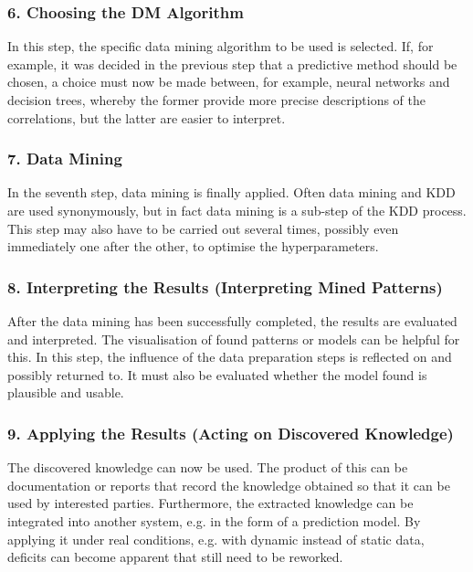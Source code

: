 \subsubsection{6. Choosing the DM Algorithm}

In this step, the specific data mining algorithm to be used is selected. If, for example, it was decided in the previous step that a predictive method should be chosen, a choice must now be made between, for example, neural networks and decision trees, whereby the former provide more precise descriptions of the correlations, but the latter are easier to interpret. \cite{Maimon:2010}

\subsubsection{7. Data Mining}

In the seventh step, data mining is finally applied. Often data mining and KDD are used synonymously, but in fact data mining is a sub-step of the KDD process. \cite{Fayyad:1996}
This step may also have to be carried out several times, possibly even immediately one after the other, 
to optimise the hyperparameters. \cite{Maimon:2010}

\subsubsection{8. Interpreting the Results (Interpreting Mined Patterns)}

After the data mining has been successfully completed, the results are evaluated and interpreted. The visualisation of found patterns or models can be helpful for this. In this step, the influence of the data preparation steps is reflected on and possibly returned to. It must also be evaluated whether the model found is plausible and usable. \cite{Fayyad:1996,Maimon:2010}

\subsubsection{9. Applying the Results (Acting on Discovered Knowledge)}

The discovered knowledge can now be used. The product of this can be documentation or reports that record the knowledge obtained so that it can be used by interested parties. Furthermore, the extracted knowledge can be integrated into another system, e.g. in the form of a prediction model. By applying it under real conditions, e.g. with dynamic instead of static data, deficits can become apparent that still need to be reworked. \cite{Fayyad:1996,Maimon:2010}

